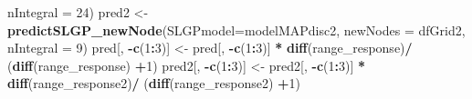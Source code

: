 \documentclass[
]{article}
\newenvironment{Shaded}{\begin{snugshade}}{\end{snugshade}}
\newcommand{\AttributeTok}[1]{\textcolor[rgb]{0.13,0.29,0.53}{#1}}
\newcommand{\DecValTok}[1]{\textcolor[rgb]{0.00,0.00,0.81}{#1}}
\newcommand{\FunctionTok}[1]{\textcolor[rgb]{0.13,0.29,0.53}{\textbf{#1}}}
\newcommand{\NormalTok}[1]{#1}
\newcommand{\OtherTok}[1]{\textcolor[rgb]{0.56,0.35,0.01}{#1}}
\newcommand{\SpecialCharTok}[1]{\textcolor[rgb]{0.81,0.36,0.00}{\textbf{#1}}}
\begin{document}
\begin{Shaded}
\begin{Highlighting}[]
                            \AttributeTok{nIntegral =} \DecValTok{24}\NormalTok{)}
\NormalTok{pred2 }\OtherTok{\textless{}{-}} \FunctionTok{predictSLGP\_newNode}\NormalTok{(}\AttributeTok{SLGPmodel=}\NormalTok{modelMAPdisc2,}
                             \AttributeTok{newNodes =}\NormalTok{ dfGrid2,}
                             \AttributeTok{nIntegral =} \DecValTok{9}\NormalTok{)}
\NormalTok{pred[, }\SpecialCharTok{{-}}\FunctionTok{c}\NormalTok{(}\DecValTok{1}\SpecialCharTok{:}\DecValTok{3}\NormalTok{)] }\OtherTok{\textless{}{-}}\NormalTok{ pred[, }\SpecialCharTok{{-}}\FunctionTok{c}\NormalTok{(}\DecValTok{1}\SpecialCharTok{:}\DecValTok{3}\NormalTok{)] }\SpecialCharTok{*} \FunctionTok{diff}\NormalTok{(range\_response)}\SpecialCharTok{/}
\NormalTok{  (}\FunctionTok{diff}\NormalTok{(range\_response) }\SpecialCharTok{+}\DecValTok{1}\NormalTok{) }
\NormalTok{pred2[, }\SpecialCharTok{{-}}\FunctionTok{c}\NormalTok{(}\DecValTok{1}\SpecialCharTok{:}\DecValTok{3}\NormalTok{)] }\OtherTok{\textless{}{-}}\NormalTok{ pred2[, }\SpecialCharTok{{-}}\FunctionTok{c}\NormalTok{(}\DecValTok{1}\SpecialCharTok{:}\DecValTok{3}\NormalTok{)] }\SpecialCharTok{*} \FunctionTok{diff}\NormalTok{(range\_response2)}\SpecialCharTok{/}
\NormalTok{  (}\FunctionTok{diff}\NormalTok{(range\_response2) }\SpecialCharTok{+}\DecValTok{1}\NormalTok{) }
\end{Highlighting}
\end{Shaded}
\end{document}
